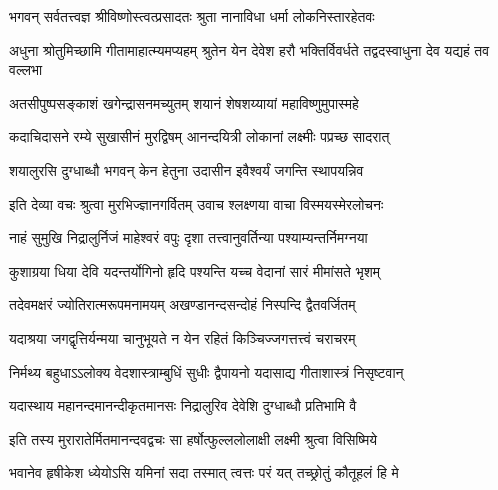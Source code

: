 \ganapatyadiDhyanam
\padmaPuranam



\twolineshloka
{भगवन् सर्वतत्त्वज्ञ श्रीविष्णोस्त्वत्प्रसादतः}
{श्रुता नानाविधा धर्मा लोकनिस्तारहेतवः} %

\threelineshloka
{अधुना श्रोतुमिच्छामि गीतामाहात्म्यमप्यहम्}
{श्रुतेन येन देवेश हरौ भक्तिर्विवर्धते}
{तद्वदस्वाधुना देव यद्यहं तव वल्लभा} %


\twolineshloka
{अतसीपुष्पसङ्काशं खगेन्द्रासनमच्युतम्}
{शयानं शेषशय्यायां महाविष्णुमुपास्महे} %

\twolineshloka
{कदाचिदासने रम्ये सुखासीनं मुरद्विषम्}
{आनन्दयित्री लोकानां लक्ष्मीः पप्रच्छ सादरात्} %


\twolineshloka
{शयालुरसि दुग्धाब्धौ भगवन् केन हेतुना}
{उदासीन इवैश्वर्यं जगन्ति स्थापयन्निव} %


\twolineshloka
{इति देव्या वचः श्रुत्वा मुरभिज्ज्ञानगर्वितम्}
{उवाच श्लक्ष्णया वाचा विस्मयस्मेरलोचनः} %


\twolineshloka
{नाहं सुमुखि निद्रालुर्निजं माहेश्वरं वपुः}
{दृशा तत्त्वानुवर्तिन्या पश्याम्यन्तर्निमग्नया} %

\twolineshloka
{कुशाग्रया धिया देवि यदन्तर्योगिनो हृदि}
{पश्यन्ति यच्च वेदानां सारं मीमांसते भृशम्} %

\twolineshloka
{तदेवमक्षरं ज्योतिरात्मरूपमनामयम्}
{अखण्डानन्दसन्दोहं निस्पन्दि द्वैतवर्जितम्} %

\twolineshloka
{यदाश्रया जगद्वृत्तिर्यन्मया चानुभूयते}
{न येन रहितं किञ्चिज्जगत्तत्त्वं चराचरम्} %

\twolineshloka
{निर्मथ्य बहुधाऽऽलोक्य वेदशास्त्राम्बुधिं सुधीः}
{द्वैपायनो यदासाद्य गीताशास्त्रं निसृष्टवान्} %

\twolineshloka
{यदास्थाय महानन्दमानन्दीकृतमानसः}
{निद्रालुरिव देवेशि दुग्धाब्धौ प्रतिभामि वै} %

\twolineshloka
{इति तस्य मुरारातेर्मितमानन्दवद्वचः}
{सा हर्षोत्फुल्ललोलाक्षी लक्ष्मी श्रुत्वा विसिष्मिये} %


\twolineshloka
{भवानेव हृषीकेश ध्येयोऽसि यमिनां सदा}
{तस्मात् त्वत्तः परं यत् तच्छ्रोतुं कौतूहलं हि मे} %


